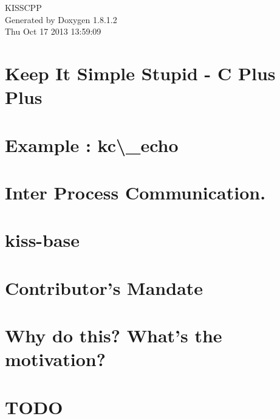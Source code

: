 \documentclass{book}
\begin{document}
\hypersetup{pageanchor=false,citecolor=blue}
\begin{titlepage}
\vspace*{7cm}
\begin{center}
{\Large K\-I\-S\-S\-C\-P\-P }\\
\vspace*{1cm}
{\large Generated by Doxygen 1.8.1.2}\\
\vspace*{0.5cm}
{\small Thu Oct 17 2013 13:59:09}\\
\end{center}
\end{titlepage}
\clearemptydoublepage
{}
\tableofcontents
\clearemptydoublepage
{}
\hypersetup{pageanchor=true,citecolor=blue}
\chapter{Keep It Simple Stupid -\/ C Plus Plus}
\label{index}\hypertarget{index}{}
\chapter{Example \-: kc\textbackslash{}\-\_\-echo}
\label{md_example_echo}
\hypertarget{md_example_echo}{}

\chapter{Inter Process Communication.}
\label{md_inter_process_communication}
\hypertarget{md_inter_process_communication}{}

\chapter{kiss-\/base}
\label{md_kiss-base}
\hypertarget{md_kiss-base}{}

\chapter{Contributor's Mandate}
\label{md_mandate}
\hypertarget{md_mandate}{}

\chapter{Why do this? What's the motivation?}
\label{md_motivation}
\hypertarget{md_motivation}{}

\chapter{T\-O\-D\-O}
\label{md_todo}
\hypertarget{md_todo}{}

\end{document}
